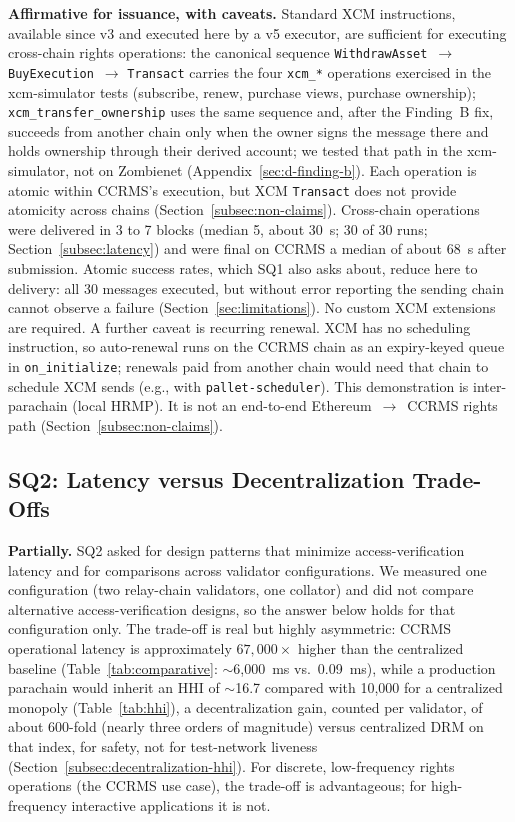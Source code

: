 \textbf{Affirmative for issuance, with caveats.} Standard XCM instructions, available since v3 and executed here by a v5 executor, are sufficient for executing cross-chain rights operations: the canonical sequence \texttt{WithdrawAsset}~$\to$ \texttt{BuyExecution}~$\to$ \texttt{Transact} carries the four \texttt{xcm\_*} operations exercised in the xcm-simulator tests (subscribe, renew, purchase views, purchase ownership); \texttt{xcm\_transfer\_ownership} uses the same sequence and, after the Finding~B fix, succeeds from another chain only when the owner signs the message there and holds ownership through their derived account; we tested that path in the xcm-simulator, not on Zombienet (Appendix~\ref{sec:d-finding-b}). Each operation is atomic within CCRMS's execution, but XCM \texttt{Transact} does not provide atomicity across chains (Section~\ref{subsec:non-claims}). Cross-chain operations were delivered in 3 to 7 blocks (median 5, about 30~s; 30 of 30 runs; Section~\ref{subsec:latency}) and were final on CCRMS a median of about 68~s after submission. Atomic success rates, which SQ1 also asks about, reduce here to delivery: all 30 messages executed, but without error reporting the sending chain cannot observe a failure (Section~\ref{sec:limitations}). No custom XCM extensions are required. A further caveat is recurring renewal. XCM has no scheduling instruction, so auto-renewal runs on the CCRMS chain as an expiry-keyed queue in \texttt{on\_initialize}; renewals paid from another chain would need that chain to schedule XCM sends (e.g., with \texttt{pallet-scheduler}). This demonstration is inter-parachain (local HRMP). It is not an end-to-end Ethereum~$\to$~CCRMS rights path (Section~\ref{subsec:non-claims}).

\subsection[SQ2: Latency versus Decentralization]{SQ2: Latency versus Decentralization Trade-Offs}\label{subsec:sq2-latency-decentralization}

\textbf{Partially.} SQ2 asked for design patterns that minimize access-verification latency and for comparisons across validator configurations. We measured one configuration (two relay-chain validators, one collator) and did not compare alternative access-verification designs, so the answer below holds for that configuration only. The trade-off is real but highly asymmetric: CCRMS operational latency is approximately $67{,}000\times$ higher than the centralized baseline (Table~\ref{tab:comparative}: $\sim$6,000~ms vs.\ 0.09~ms), while a production parachain would inherit an HHI of $\sim$16.7 compared with 10,000 for a centralized monopoly (Table~\ref{tab:hhi}), a decentralization gain, counted per validator, of about 600-fold (nearly three orders of magnitude) versus centralized DRM on that index, for safety, not for test-network liveness (Section~\ref{subsec:decentralization-hhi}). For discrete, low-frequency rights operations (the CCRMS use case), the trade-off is advantageous; for high-frequency interactive applications it is not.

